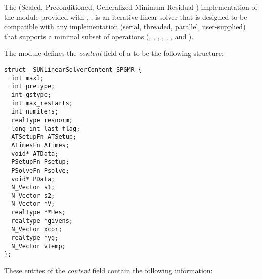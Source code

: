 
The {\spgmr} (Scaled, Preconditioned, Generalized Minimum
Residual \cite{SaSc:86}) implementation of the {\sunlinsol} module
provided with {\sundials}, {\sunlinsolspgmr}, is an iterative linear
solver that is designed to be compatible with any {\nvector}
implementation (serial, threaded, parallel, user-supplied) that
supports a minimal subset of operations (, 
, , , ,
,  and ).  

The {\sunlinsolspgmr} module defines the {\em content} field of a
 to be the following structure:
\begin{verbatim} 
struct _SUNLinearSolverContent_SPGMR {
  int maxl;
  int pretype;
  int gstype;
  int max_restarts;
  int numiters;
  realtype resnorm;
  long int last_flag;
  ATSetupFn ATSetup;
  ATimesFn ATimes;
  void* ATData;
  PSetupFn Psetup;
  PSolveFn Psolve;
  void* PData;
  N_Vector s1;
  N_Vector s2;
  N_Vector *V;
  realtype **Hes;
  realtype *givens;
  N_Vector xcor;
  realtype *yg;
  N_Vector vtemp;
};
\end{verbatim}
These entries of the \emph{content} field contain the following
information:
